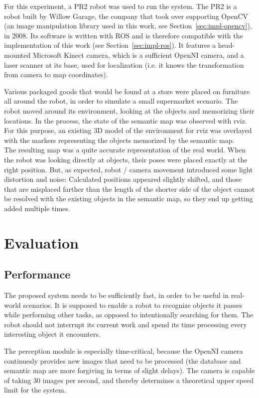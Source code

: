 For this experiment, a PR2 robot  was used to run the system. The PR2 is a robot built by Willow Garage, the company that took over supporting OpenCV (an image manipulation library used in this work, see Section~\ref{sec:impl-opencv}), in 2008. Its software is written with ROS and is therefore compatible with the implementation of this work (see Section~\ref{sec:impl-ros}). It features a head-mounted Microsoft Kinect camera, which is a sufficient OpenNI camera, and a laser scanner at its base, used for localization (i.e. it knows the transformation from camera to map coordinates).

Various packaged goods that would be found at a store were placed on furniture all around the robot, in order to simulate a small supermarket scenario. The robot moved around its environment, looking at the objects and memorizing their locations. In the process, the state of the semantic map was observed with rviz. For this purpose, an existing 3D model of the environment for rviz was overlayed with the markers representing the objects memorized by the semantic map. \\

The resulting map was a quite accurate representation of the real world. When the robot was looking directly at objects, their poses were placed exactly at the right position. But, as expected, robot / camera movement introduced some light distortion and noise: Calculated positions appeared slightly shifted, and those that are misplaced farther than the length of the shorter side of the object cannot be resolved with the existing objects in the semantic map, so they end up getting added multiple times.


\section{Evaluation}

\subsection*{Performance}
\label{sec:eval-performance}
The proposed system needs to be sufficiently fast, in order to be useful in real-world scenarios. It is supposed to enable a robot to recognize objects it passes while performing other tasks, as opposed to intentionally searching for them. The robot should not interrupt its current work and spend its time processing every interesting object it encounters.

The perception module is especially time-critical, because the OpenNI camera continuesly provides new images that need to be processed (the database and semantic map are more forgiving in terms of slight delays). The camera is capable of taking 30 images per second, and thereby determines a theoretical upper speed limit for the system. \\

